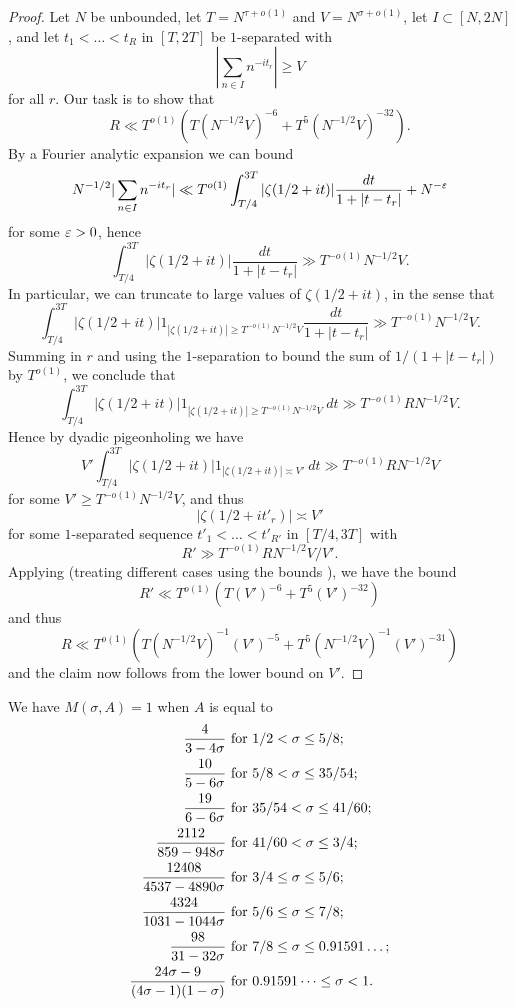 \begin{proof} Let $N$ be unbounded, let $T = N^{\tau+o(1)}$ and $V = N^{\sigma+o(1)}$, let $I \subset [N,2N]$, and let $t_1 < \dots < t_R$ in $[T,2T]$ be $1$-separated with
$$ |\sum_{n \in I} n^{-it_r}| \geq V$$
for all $r$.  Our task is to show that
$$ R \ll T^{o(1)} ( T (N^{-1/2} V)^{-6} + T^5 (N^{-1/2} V)^{-32}).$$
By a Fourier analytic expansion we can bound
$$ N^{-1/2} |\sum_{n \in I} n^{-it_r}| \ll T^{o(1)} \int_{T/4}^{3T} |\zeta(1/2+it)| \frac{dt}{1+|t-t_r|} + N^{-\varepsilon}$$
for some $\varepsilon>0$, hence
$$ \int_{T/4}^{3T} |\zeta(1/2+it)| \frac{dt}{1+|t-t_r|} \gg T^{-o(1)} N^{-1/2} V.$$
In particular, we can truncate to large values of $\zeta(1/2+it)$, in the sense that
$$ \int_{T/4}^{3T} |\zeta(1/2+it)| 1_{|\zeta(1/2+it)| \geq T^{-o(1)} N^{-1/2} V} \frac{dt}{1+|t-t_r|} \gg T^{-o(1)} N^{-1/2} V.$$
Summing in $r$ and using the $1$-separation to bound the sum of $1/(1+|t-t_r|)$ by $T^{o(1)}$, we conclude that
$$ \int_{T/4}^{3T} |\zeta(1/2+it)| 1_{|\zeta(1/2+it)| \geq T^{-o(1)} N^{-1/2} V} \ dt \gg T^{-o(1)} R N^{-1/2} V.$$
Hence by dyadic pigeonholing we have
$$ V' \int_{T/4}^{3T} |\zeta(1/2+it)| 1_{|\zeta(1/2+it)| \asymp V'} \ dt \gg T^{-o(1)} R N^{-1/2} V$$
for some $V' \geq T^{-o(1)} N^{-1/2} V$, and thus
$$ |\zeta(1/2+it'_r)| \asymp V'$$
for some $1$-separated sequence $t'_1 < \dots < t'_{R'}$ in $[T/4, 3T]$ with
$$ R' \gg T^{-o(1)} R N^{-1/2} V / V'.$$
Applying \cite[Theorem 2]{heathbrown_twelfth_1978} (treating different cases using the bounds \cite[(7), (8), (9)]{heathbrown_twelfth_1978}), we have the bound
$$ R' \ll T^{o(1)} ( T (V')^{-6} + T^5 (V')^{-32})$$
and thus
$$ R \ll T^{o(1)} ( T (N^{-1/2} V)^{-1} (V')^{-5} + T^5 (N^{-1/2} V)^{-1} (V')^{-31})$$
and the claim now follows from the lower bound on $V'$.
\end{proof}

\begin{lemma}\label{ivic-moment}\cite[Theorem 8.4]{ivic}  We have $M(\sigma,A) = 1$ when $A$ is equal to
\begin{align*}
    \frac{4}{3-4\sigma} & \hbox{ for } 1/2 < \sigma \leq 5/8; \\
    \frac{10}{5-6\sigma} & \hbox{ for } 5/8 < \sigma \leq 35/54; \\
    \frac{19}{6-6\sigma} & \hbox{ for } 35/54 < \sigma \leq 41/60; \\
    \frac{2112}{859-948\sigma} & \hbox{ for } 41/60 < \sigma \leq 3/4;\\
    \frac{12408}{4537-4890\sigma} & \hbox{ for } 3/4 \leq \sigma \leq 5/6; \\
    \frac{4324}{1031-1044\sigma} & \hbox{ for } 5/6 \leq \sigma \leq 7/8; \\
    \frac{98}{31-32\sigma} & \hbox{ for } 7/8 \leq \sigma \leq 0.91591\dots; \\
    \frac{24\sigma-9}{(4\sigma-1)(1-\sigma)} & \hbox{ for } 0.91591\dots \leq \sigma < 1.
\end{align*}
\end{lemma}

